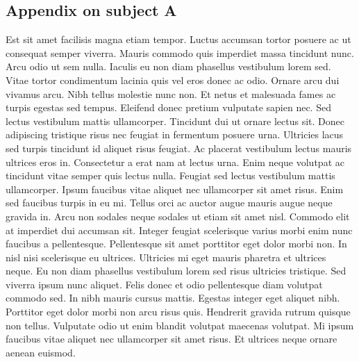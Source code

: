 \documentclass[12pt]{article}
\begin{document}
\clearpage
\begin{appendices}
	
\section{Appendix on subject A} \label{ap:plans}

\par Est sit amet facilisis magna etiam tempor. Luctus accumsan tortor posuere ac ut consequat semper viverra. Mauris commodo quis imperdiet massa tincidunt nunc. Arcu odio ut sem nulla. Iaculis eu non diam phasellus vestibulum lorem sed. Vitae tortor condimentum lacinia quis vel eros donec ac odio. Ornare arcu dui vivamus arcu. Nibh tellus molestie nunc non. Et netus et malesuada fames ac turpis egestas sed tempus. Eleifend donec pretium vulputate sapien nec. Sed lectus vestibulum mattis ullamcorper. Tincidunt dui ut ornare lectus sit. Donec adipiscing tristique risus nec feugiat in fermentum posuere urna. Ultricies lacus sed turpis tincidunt id aliquet risus feugiat. Ac placerat vestibulum lectus mauris ultrices eros in. Consectetur a erat nam at lectus urna. Enim neque volutpat ac tincidunt vitae semper quis lectus nulla. Feugiat sed lectus vestibulum mattis ullamcorper. Ipsum faucibus vitae aliquet nec ullamcorper sit amet risus. Enim sed faucibus turpis in eu mi. Tellus orci ac auctor augue mauris augue neque gravida in. Arcu non sodales neque sodales ut etiam sit amet nisl. Commodo elit at imperdiet dui accumsan sit. Integer feugiat scelerisque varius morbi enim nunc faucibus a pellentesque. Pellentesque sit amet porttitor eget dolor morbi non. In nisl nisi scelerisque eu ultrices. Ultricies mi eget mauris pharetra et ultrices neque. Eu non diam phasellus vestibulum lorem sed risus ultricies tristique. Sed viverra ipsum nunc aliquet. Felis donec et odio pellentesque diam volutpat commodo sed. In nibh mauris cursus mattis. Egestas integer eget aliquet nibh. Porttitor eget dolor morbi non arcu risus quis. Hendrerit gravida rutrum quisque non tellus. Vulputate odio ut enim blandit volutpat maecenas volutpat. Mi ipsum faucibus vitae aliquet nec ullamcorper sit amet risus. Et ultrices neque ornare aenean euismod.

\clearpage
\end{appendices}

\clearpage
\singlespacing
\printbibliography
\end{document}
